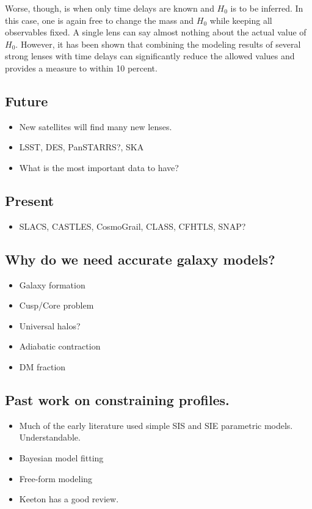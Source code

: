 \documentclass[onecolumn,galley]{mn2e}
\begin{document}
Worse, though, is when only time delays are known and $H_0$ is to be inferred.
In this case, one is again free to change the mass and $H_0$ while keeping
all observables fixed. A single lens can say almost nothing about the actual
value of $H_0$. However, it has been shown that combining the modeling results
of several strong lenses with time delays can significantly reduce the allowed
values and provides a measure to within 10 percent.

\subsection{Future} %
    \begin{itemize}
    \item New satellites will find many new lenses.
    \item LSST, DES, PanSTARRS?, SKA
    \item What is the most important data to have?
    \end{itemize}


\subsection{Present} %
    \begin{itemize}
    \item SLACS, CASTLES, CosmoGrail, CLASS, CFHTLS, SNAP?
    \end{itemize}

\subsection{Why do we need accurate galaxy models?} %
    \begin{itemize}
    \item Galaxy formation
    \item Cusp/Core problem
    \item Universal halos?
    \item Adiabatic contraction
    \item DM fraction
    \end{itemize}


\subsection{Past work on constraining profiles.} %
    \begin{itemize}
    \item Much of the early literature used simple SIS and SIE parametric models. Understandable.
    \item Bayesian model fitting
    \item Free-form modeling
    \item Keeton has a good review.
    \end{itemize}
\end{document}

